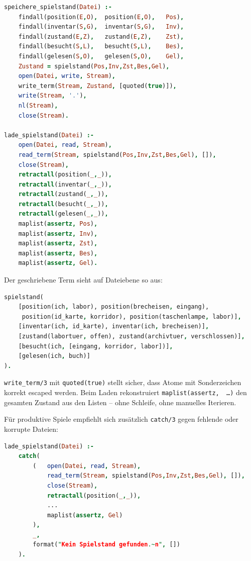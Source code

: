 \documentclass[parskip=half,a4paper,11pt]{scrreprt}
\begin{document}
\begin{lstlisting}[language=Prolog, caption={Spielstand als Term serialisieren}]
speichere_spielstand(Datei) :-
    findall(position(E,O),  position(E,O),   Pos),
    findall(inventar(S,G),  inventar(S,G),   Inv),
    findall(zustand(E,Z),   zustand(E,Z),    Zst),
    findall(besucht(S,L),   besucht(S,L),    Bes),
    findall(gelesen(S,O),   gelesen(S,O),    Gel),
    Zustand = spielstand(Pos,Inv,Zst,Bes,Gel),
    open(Datei, write, Stream),
    write_term(Stream, Zustand, [quoted(true)]),
    write(Stream, '.'),
    nl(Stream),
    close(Stream).

lade_spielstand(Datei) :-
    open(Datei, read, Stream),
    read_term(Stream, spielstand(Pos,Inv,Zst,Bes,Gel), []),
    close(Stream),
    retractall(position(_,_)),
    retractall(inventar(_,_)),
    retractall(zustand(_,_)),
    retractall(besucht(_,_)),
    retractall(gelesen(_,_)),
    maplist(assertz, Pos),
    maplist(assertz, Inv),
    maplist(assertz, Zst),
    maplist(assertz, Bes),
    maplist(assertz, Gel).
\end{lstlisting}

Der geschriebene Term sieht auf Dateiebene so aus:

\begin{lstlisting}[language=Prolog, caption={Serialisierter Spielstand (gekürzt)}]
spielstand(
    [position(ich, labor), position(brecheisen, eingang),
     position(id_karte, korridor), position(taschenlampe, labor)],
    [inventar(ich, id_karte), inventar(ich, brecheisen)],
    [zustand(labortuer, offen), zustand(archivtuer, verschlossen)],
    [besucht(ich, [eingang, korridor, labor])],
    [gelesen(ich, buch)]
).
\end{lstlisting}

\texttt{write\_term/3} mit \texttt{quoted(true)} stellt sicher, dass Atome mit Sonderzeichen korrekt escaped werden. Beim Laden rekonstruiert \texttt{maplist(assertz, \,\ldots)} den gesamten Zustand aus den Listen – ohne Schleife, ohne manuelles Iterieren.

Für produktive Spiele empfiehlt sich zusätzlich \texttt{catch/3} gegen fehlende oder korrupte Dateien:

\begin{lstlisting}[language=Prolog, caption={Fehlerbehandlung beim Laden}]
lade_spielstand(Datei) :-
    catch(
        (   open(Datei, read, Stream),
            read_term(Stream, spielstand(Pos,Inv,Zst,Bes,Gel), []),
            close(Stream),
            retractall(position(_,_)),
            ...
            maplist(assertz, Gel)
        ),
        _,
        format("Kein Spielstand gefunden.~n", [])
    ).
\end{lstlisting}
\end{document}
